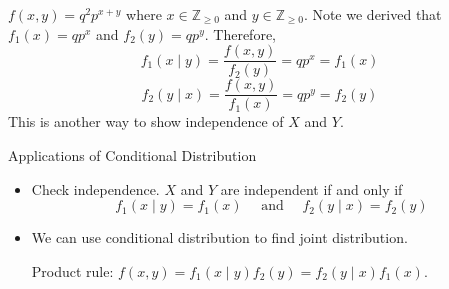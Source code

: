 \begin{Example}{}{}
    $ f(x,y)=q^2p^{x+y} $ where $ x\in\mathbb{Z}_{\geqslant 0} $
    and $ y\in\mathbb{Z}_{\geqslant 0} $. Note we derived
    that $ f_1(x)=qp^x $ and $ f_2(y)=qp^y $. Therefore,
    \[ f_1(x\mid y)=\frac{f(x,y)}{f_2(y)} =qp^x=f_1(x) \]
    \[ f_2(y\mid x)=\frac{f(x,y)}{f_1(x)}=qp^y=f_2(y) \]
    This is another way to show independence of $ X $ and $ Y $.
\end{Example}
\begin{Remark}{Applications of Conditional Distribution}{}
    \begin{itemize}
        \item Check independence. $ X $ and $ Y $ are independent
              if and only if
              \[ f_1(x\mid y)=f_1(x)\quad\text{ and }\quad f_2(y\mid x)=f_2(y) \]
        \item We can use conditional distribution to find joint distribution.

              Product rule: $ f(x,y)=f_1(x\mid y)f_2(y)=f_2(y\mid x)f_1(x) $.
    \end{itemize}
\end{Remark}
